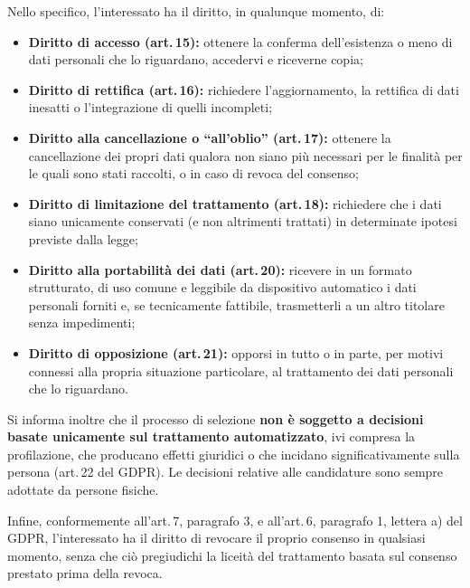 \documentclass[legal]{core/polinetwork}
\begin{document}
Nello specifico, l'interessato ha il diritto, in qualunque momento, di:

\begin{itemize}
  \item \textbf{Diritto di accesso (art.\,15):} ottenere la conferma
    dell'esistenza o meno di dati personali che lo riguardano, accedervi
    e riceverne copia;
  \item \textbf{Diritto di rettifica (art.\,16):} richiedere
    l'aggiornamento, la rettifica di dati inesatti o l'integrazione di
    quelli incompleti;
  \item \textbf{Diritto alla cancellazione o ``all'oblio'' (art.\,17):}
    ottenere la cancellazione dei propri dati qualora non siano più
    necessari per le finalità per le quali sono stati raccolti, o in caso
    di revoca del consenso;
  \item \textbf{Diritto di limitazione del trattamento (art.\,18):}
    richiedere che i dati siano unicamente conservati (e non altrimenti
    trattati) in determinate ipotesi previste dalla legge;
  \item \textbf{Diritto alla portabilità dei dati (art.\,20):} ricevere
    in un formato strutturato, di uso comune e leggibile da dispositivo
    automatico i dati personali forniti e, se tecnicamente fattibile,
    trasmetterli a un altro titolare senza impedimenti;
  \item \textbf{Diritto di opposizione (art.\,21):} opporsi in tutto o
    in parte, per motivi connessi alla propria situazione particolare,
    al trattamento dei dati personali che lo riguardano.
\end{itemize}

Si informa inoltre che il processo di selezione \textbf{non è soggetto a
decisioni basate unicamente sul trattamento automatizzato}, ivi compresa
la profilazione, che producano effetti giuridici o che incidano
significativamente sulla persona (art.\,22 del GDPR). Le decisioni
relative alle candidature sono sempre adottate da persone fisiche.


Infine, conformemente all'art.\,7, paragrafo 3, e all'art.\,6, paragrafo
1, lettera a) del GDPR, l'interessato ha il diritto di revocare il proprio
consenso in qualsiasi momento, senza che ciò pregiudichi la liceità del
trattamento basata sul consenso prestato prima della revoca.


\vfill
\pnContactBlock
\end{document}
